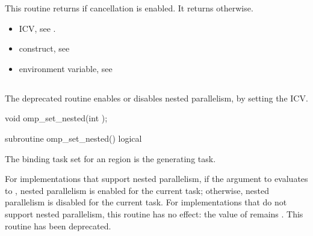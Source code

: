 \effect
This routine returns  if cancellation is enabled. It returns  otherwise.

\crossreferences
\begin{itemize}
\item {} ICV, see 
.

\item {} construct, see 

\item {} environment variable, see 
\end{itemize}









\subsection{}
\label{subsec:omp_set_nested}
\summary
The deprecated  routine enables or disables nested parallelism, by setting the 
 ICV. 

\format
\begin{ccppspecific}
\begin{boxedcode}
void omp\_set\_nested(int );
\end{boxedcode}
\end{ccppspecific}

\newpage %

\begin{fortranspecific}
\begin{boxedcode}
subroutine omp\_set\_nested()
logical 
\end{boxedcode}
\end{fortranspecific}

\binding
The binding task set for an  region is the generating task. 

\effect
For implementations that support nested parallelism, if the argument to 
 evaluates to , nested parallelism is enabled for the current task; 
otherwise, nested parallelism is disabled for the current task. For implementations that 
do not support nested parallelism, this routine has no effect: the value of  
remains . This routine has been deprecated.

